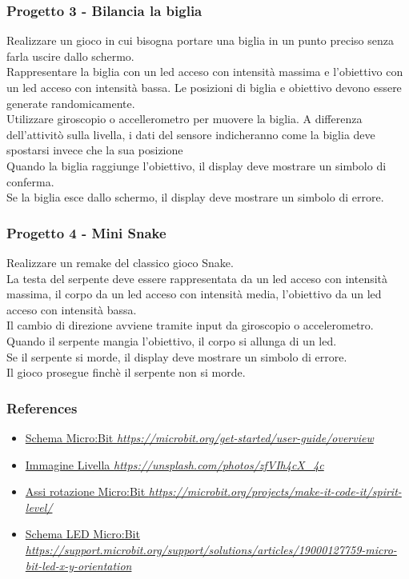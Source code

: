 \documentclass{beamer}
\begin{document}
\begin{frame}
	\frametitle{Progetto 3 - Bilancia la biglia}

	Realizzare un gioco in cui bisogna portare una biglia in un punto preciso senza farla uscire dallo schermo.\\
	Rappresentare la biglia con un led acceso con intensità massima e l'obiettivo con un led acceso con intensità bassa. Le posizioni di biglia e obiettivo devono essere generate randomicamente.\\
	Utilizzare giroscopio o accellerometro per muovere la biglia. A differenza dell'attivitò sulla livella, i dati del sensore indicheranno come la biglia deve spostarsi invece che la sua posizione\\
	Quando la biglia raggiunge l'obiettivo, il display deve mostrare un simbolo di conferma.\\
	Se la biglia esce dallo schermo, il display deve mostrare un simbolo di errore.	

\end{frame}

\begin{frame}
	\frametitle{Progetto 4 - Mini Snake}

	Realizzare un remake del classico gioco Snake.\\
	La testa del serpente deve essere rappresentata da un led acceso con intensità massima, il corpo da un led acceso con intensità media, l'obiettivo da un led acceso con intensità bassa.\\
	Il cambio di direzione avviene tramite input da giroscopio o accelerometro.\\
	Quando il serpente mangia l'obiettivo, il corpo si allunga di un led.\\
	Se il serpente si morde, il display deve mostrare un simbolo di errore.\\
	Il gioco prosegue finchè il serpente non si morde.

\end{frame}

\begin{frame}
	\frametitle{References}
	\begin{itemize}
		\item \href{https://microbit.org/get-started/user-guide/overview/}{Schema Micro:Bit \textit{https://microbit.org/get-started/user-guide/overview}}
		\item \href{https://unsplash.com/photos/zfVIh4cX_4c}{Immagine Livella \textit{https://unsplash.com/photos/zfVIh4cX\_4c}} 
		\item \href{https://microbit.org/projects/make-it-code-it/spirit-level/}{Assi rotazione Micro:Bit \textit{https://microbit.org/projects/make-it-code-it/spirit-level/}}
		\item \href{https://support.microbit.org/support/solutions/articles/19000127759-micro-bit-led-x-y-orientation}{Schema LED Micro:Bit \textit{https://support.microbit.org/support/solutions/articles/19000127759-micro-bit-led-x-y-orientation}}
	\end{itemize}
\end{frame}
\end{document}
